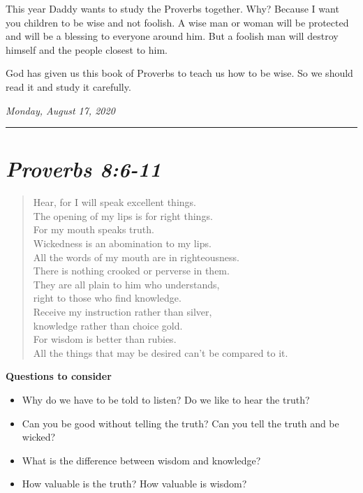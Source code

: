 \documentclass[
]{book}
\providecommand{\tightlist}{%
  \setlength{\itemsep}{0pt}\setlength{\parskip}{0pt}}
\begin{document}
This year Daddy wants to study the Proverbs together. Why? Because I want you children to be wise and not foolish. A wise man or woman will be protected and will be a blessing to everyone around him. But a foolish man will destroy himself and the people closest to him.

God has given us this book of Proverbs to teach us how to be wise. So we should read it and study it carefully.

\emph{Monday, August 17, 2020}

\begin{center}\rule{0.5\linewidth}{0.5pt}\end{center}

\hypertarget{proverbs-86-11}{%
\section{\texorpdfstring{\emph{Proverbs 8:6-11}}{Proverbs 8:6-11}}\label{proverbs-86-11}}

\begin{quote}
Hear, for I will speak excellent things.\\
The opening of my lips is for right things.\\
For my mouth speaks truth.\\
Wickedness is an abomination to my lips.\\
All the words of my mouth are in righteousness.\\
There is nothing crooked or perverse in them.\\
They are all plain to him who understands,\\
right to those who find knowledge.\\
Receive my instruction rather than silver,\\
knowledge rather than choice gold.\\
For wisdom is better than rubies.\\
All the things that may be desired can't be compared to it.
\end{quote}

\textbf{Questions to consider}

\begin{itemize}
\tightlist
\item
  Why do we have to be told to listen? Do we like to hear the truth?
\item
  Can you be good without telling the truth? Can you tell the truth and be wicked?
\item
  What is the difference between wisdom and knowledge?
\item
  How valuable is the truth? How valuable is wisdom?
\end{itemize}
\end{document}
